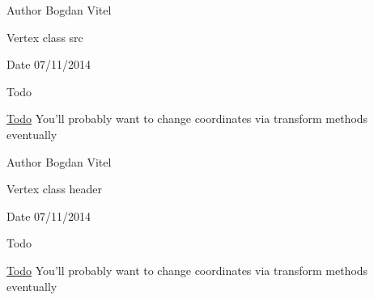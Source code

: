\begin{DoxyAuthor}{Author}
Bogdan Vitel
\end{DoxyAuthor}
Vertex class src \begin{DoxyDate}{Date}
07/11/2014 
\end{DoxyDate}
\begin{DoxyRefDesc}{Todo}
\item[\hyperlink{todo__todo000017}{Todo}]You'll probably want to change coordinates via transform methods eventually \end{DoxyRefDesc}


\begin{DoxyAuthor}{Author}
Bogdan Vitel
\end{DoxyAuthor}
Vertex class header \begin{DoxyDate}{Date}
07/11/2014 
\end{DoxyDate}
\begin{DoxyRefDesc}{Todo}
\item[\hyperlink{todo__todo000018}{Todo}]You'll probably want to change coordinates via transform methods eventually \end{DoxyRefDesc}
